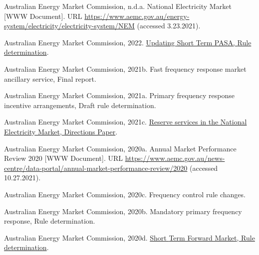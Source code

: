 \documentclass[12pt,a4paper,]{report}
\newlength{\cslhangindent}
\newenvironment{CSLReferences}[2] %
 {%
  \setlength{\parindent}{0pt}
  \ifodd #1 \everypar{\setlength{\hangindent}{\cslhangindent}}\ignorespaces\fi
  \ifnum #2 > 0
  \setlength{\parskip}{#2\baselineskip}
  \fi
 }%
 {}
\begin{document}
\begin{CSLReferences}{1}{0}
\leavevmode{}%
Australian Energy Market Commission, n.d.a. National {Electricity
Market} {[}WWW Document{]}. URL
\url{https://www.aemc.gov.au/energy-system/electricity/electricity-system/NEM}
(accessed 3.23.2021).

\leavevmode{}%
Australian Energy Market Commission, 2022.
\href{https://www.aemc.gov.au/sites/default/files/2022-05/ERC0332\%20-\%20Updating\%20Short\%20Term\%20PASA\%20-\%20Final\%20determination.pdf}{Updating
{Short Term PASA}, {Rule} determination}.

\leavevmode{}%
Australian Energy Market Commission, 2021b. Fast frequency response
market ancillary service, {Final} report.

\leavevmode{}%
Australian Energy Market Commission, 2021a. Primary frequency response
incentive arrangements, {Draft} rule determination.

\leavevmode{}%
Australian Energy Market Commission, 2021c.
\href{https://www.aemc.gov.au/sites/default/files/2021-01/Reserve\%20services\%20directions\%20paper\%20-\%205.01.2021\%20-\%20FINAL.pdf}{Reserve
services in the {National Electricity Market}, {Directions Paper}}.

\leavevmode{}%
Australian Energy Market Commission, 2020a. Annual {Market Performance
Review} 2020 {[}WWW Document{]}. URL
\url{https://www.aemc.gov.au/news-centre/data-portal/annual-market-performance-review/2020}
(accessed 10.27.2021).

\leavevmode{}%
Australian Energy Market Commission, 2020c. Frequency control rule
changes.

\leavevmode{}%
Australian Energy Market Commission, 2020b. Mandatory primary frequency
response, {Rule} determination.

\leavevmode{}%
Australian Energy Market Commission, 2020d.
\href{https://www.aemc.gov.au/sites/default/files/documents/final_determination_-_short_term_forward_market_-_clean.pdf}{Short
{Term Forward Market}, {Rule} determination}.


\end{CSLReferences}
\end{document}
